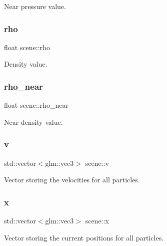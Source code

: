 Near pressure value. 

\hypertarget{classscene_a0154fc603318164e75123be413dd7d48}{}\label{classscene_a0154fc603318164e75123be413dd7d48} 
\subsubsection{\texorpdfstring{rho}{rho}}
{\footnotesize\ttfamily float scene\+::rho}



Density value. 

\hypertarget{classscene_a60b59a93c6e8f6f7ffa1f56a9c5f8f72}{}\label{classscene_a60b59a93c6e8f6f7ffa1f56a9c5f8f72} 
\subsubsection{\texorpdfstring{rho\+\_\+near}{rho\_near}}
{\footnotesize\ttfamily float scene\+::rho\+\_\+near}



Near density value. 

\hypertarget{classscene_a38b4ab71581c6d43e6e565f366cd18a6}{}\label{classscene_a38b4ab71581c6d43e6e565f366cd18a6} 
\subsubsection{\texorpdfstring{v}{v}}
{\footnotesize\ttfamily std\+::vector$<$glm\+::vec3$>$ scene\+::v}



Vector storing the velocities for all particles. 

\hypertarget{classscene_aa74e8461ea4ee06a07c00c7185d9c9ab}{}\label{classscene_aa74e8461ea4ee06a07c00c7185d9c9ab} 
\subsubsection{\texorpdfstring{x}{x}}
{\footnotesize\ttfamily std\+::vector$<$glm\+::vec3$>$ scene\+::x}



Vector storing the current positions for all particles. 

\hypertarget{classscene_a1f3d0e6a319b04ba81ea27b862a1278a}{}\label{classscene_a1f3d0e6a319b04ba81ea27b862a1278a} 
